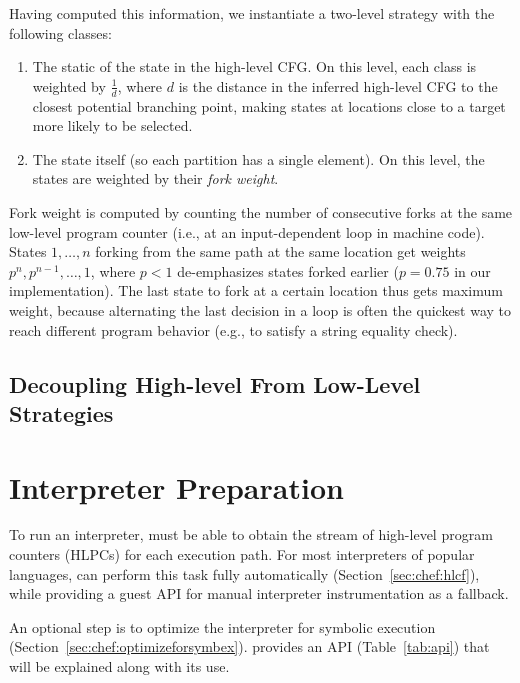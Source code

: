 Having computed this information, we instantiate a two-level \cupa strategy with the following classes:
\begin{enumerate}
\item The static \hlpc of the state in the high-level CFG.  On this level, each class is weighted by $\frac{1}{d}$, where $d$ is the distance in the inferred high-level CFG to the closest potential branching point, making states at locations close to a target more likely to be selected.
\item The state itself (so each partition has a single element).  On this level, the states are weighted by their \textit{fork weight}.
\end{enumerate}

Fork weight is computed by counting the number of consecutive forks at the same low-level program counter (i.e., at an input-dependent loop in machine code).  States $1, \ldots, n$ forking from the same path at the same location get weights $p^n, p^{n-1}, \ldots, 1$, where $p < 1$ de-emphasizes states forked earlier ($p = 0.75$ in our implementation).  The last state to fork at a certain location thus gets maximum weight, because alternating the last decision in a loop is often the quickest way to reach different program behavior (e.g., to satisfy a string equality check).


\subsection{Decoupling High-level From Low-Level Strategies}

% 



\section{Interpreter Preparation}
\label{sec:chef:recipe}

To run an interpreter, \chef must be able to obtain the stream of high-level program counters (HLPCs) for each execution path.  For most interpreters of popular languages, \chef can perform this task fully automatically (Section~\ref{sec:chef:hlcf}), while providing a guest API for manual interpreter instrumentation as a fallback.

An optional step is to optimize the interpreter for symbolic execution (Section~\ref{sec:chef:optimizeforsymbex}).  \chef provides an API (Table~\ref{tab:api}) that will be explained along with its use.

